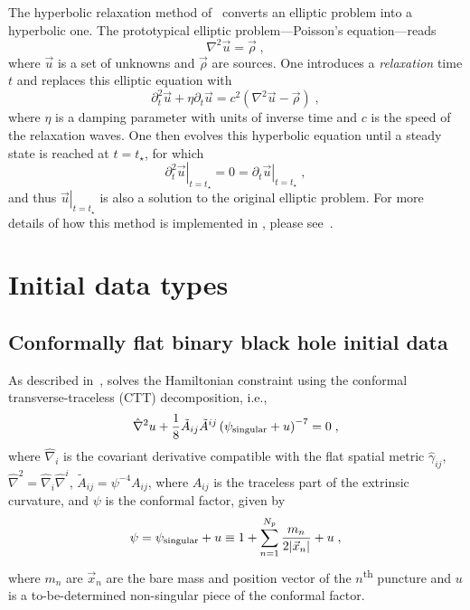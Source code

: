 The hyperbolic relaxation method of~\cite{ruter:2018} converts an elliptic
problem into a hyperbolic one. The prototypical elliptic problem---Poisson's
equation---reads
\begin{equation}
  \nabla^{2}\vec{u} = \vec{\rho}\;,
\end{equation}
where $\vec{u}$ is a set of unknowns and $\vec{\rho}$ are sources. One introduces
a \emph{relaxation} time $t$ and replaces this elliptic equation with
\begin{equation}
  \partial_{t}^{2}\vec{u} + \eta\partial_{t}\vec{u} = c^{2}\left(\nabla^{2}\vec{u} - \vec{\rho}\right)\;,
\end{equation}
where $\eta$ is a damping parameter with units of inverse time and $c$ is
the speed of the relaxation waves. One then evolves this hyperbolic equation
until a steady state is reached at $t=t_{\star}$, for which
\begin{equation}
  \left.\partial_{t}^{2}\vec{u}\right|_{t=t_{\star}} = 0 = \left.\partial_{t}\vec{u}\right|_{t=t_{\star}}\;,
\end{equation}
and thus $\left.\vec{u}\right|_{t=t_{\star}}$ is also a solution to the original
elliptic problem. For more details of how this method is implemented in \nrpyell,
please see~\cite{assumpcao:2022}.


\section{Initial data types}
\subsection{Conformally flat binary black hole initial data}

As described in~\cite{assumpcao:2022}, \nrpyell solves the Hamiltonian
constraint using the conformal transverse-traceless (CTT) decomposition, i.e.,
\begin{equation}
  \hat\nabla^{2}u + \frac{1}{8}\tilde{A}_{ij}\tilde{A}^{ij}\left(\psi_{\rm singular}+u\right)^{-7} = 0\;,
\end{equation}
where $\hat\nabla_{i}$ is the covariant derivative compatible with the flat
spatial metric $\hat\gamma_{ij}$, $\hat\nabla^{2} = \hat\nabla_{i}\hat\nabla^{i}$,
$\tilde{A}_{ij} = \psi^{-4}A_{ij}$, where $A_{ij}$ is the traceless part of the
extrinsic curvature, and $\psi$ is the conformal factor, given by
\begin{equation}
  \psi = \psi_{\rm singular} + u \equiv 1 + \sum_{n=1}^{N_{p}}\frac{m_{n}}{2|\vec{x}_{n}|} + u\;,
\end{equation}
where $m_{n}$ are $\vec{x}_{n}$ are the bare mass and position vector of the
$n$\textsuperscript{th} puncture and $u$ is a to-be-determined non-singular
piece of the conformal factor.

